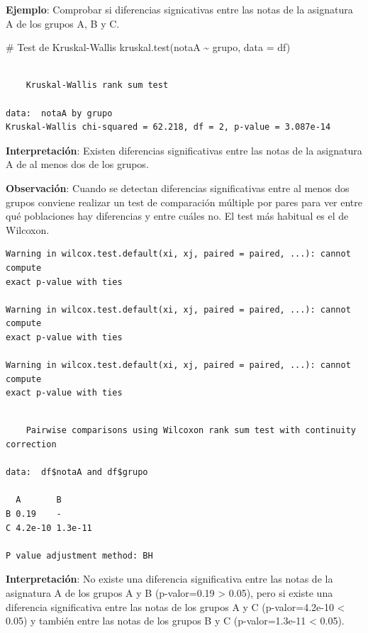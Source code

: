 \documentclass[
  a4paper,
]{scrreport}
\newenvironment{Shaded}{\begin{snugshade}}{\end{snugshade}}
\newcommand{\AttributeTok}[1]{\textcolor[rgb]{0.40,0.45,0.13}{#1}}
\newcommand{\CommentTok}[1]{\textcolor[rgb]{0.37,0.37,0.37}{#1}}
\newcommand{\FunctionTok}[1]{\textcolor[rgb]{0.28,0.35,0.67}{#1}}
\newcommand{\NormalTok}[1]{\textcolor[rgb]{0.00,0.23,0.31}{#1}}
\newcommand{\SpecialCharTok}[1]{\textcolor[rgb]{0.37,0.37,0.37}{#1}}
\newcommand{\StringTok}[1]{\textcolor[rgb]{0.13,0.47,0.30}{#1}}
\theoremstyle{definition}
\theoremstyle{definition}
\theoremstyle{remark}
\begin{document}
\textbf{Ejemplo}: Comprobar si diferencias signicativas entre las notas
de la asignatura A de los grupos A, B y C.

\begin{Shaded}
\begin{Highlighting}[]
\CommentTok{\# Test de Kruskal{-}Wallis}
\FunctionTok{kruskal.test}\NormalTok{(notaA }\SpecialCharTok{\textasciitilde{}}\NormalTok{ grupo, }\AttributeTok{data =}\NormalTok{ df)}
\end{Highlighting}
\end{Shaded}

\begin{verbatim}

    Kruskal-Wallis rank sum test

data:  notaA by grupo
Kruskal-Wallis chi-squared = 62.218, df = 2, p-value = 3.087e-14
\end{verbatim}

\textbf{Interpretación}: Existen diferencias significativas entre las
notas de la asignatura A de al menos dos de los grupos.

\textbf{Observación}: Cuando se detectan diferencias significativas
entre al menos dos grupos conviene realizar un test de comparación
múltiple por pares para ver entre qué poblaciones hay diferencias y
entre cuáles no. El test más habitual es el de Wilcoxon.

\begin{Shaded}
\end{Shaded}

\begin{verbatim}
Warning in wilcox.test.default(xi, xj, paired = paired, ...): cannot compute
exact p-value with ties

Warning in wilcox.test.default(xi, xj, paired = paired, ...): cannot compute
exact p-value with ties

Warning in wilcox.test.default(xi, xj, paired = paired, ...): cannot compute
exact p-value with ties
\end{verbatim}

\begin{verbatim}

    Pairwise comparisons using Wilcoxon rank sum test with continuity correction 

data:  df$notaA and df$grupo 

  A       B      
B 0.19    -      
C 4.2e-10 1.3e-11

P value adjustment method: BH 
\end{verbatim}

\textbf{Interpretación}: No existe una diferencia significativa entre
las notas de la asignatura A de los grupos A y B (p-valor=0.19
\textgreater{} 0.05), pero si existe una diferencia significativa entre
las notas de los grupos A y C (p-valor=4.2e-10 \textless{} 0.05) y
también entre las notas de los grupos B y C (p-valor=1.3e-11 \textless{}
0.05).
\end{document}
